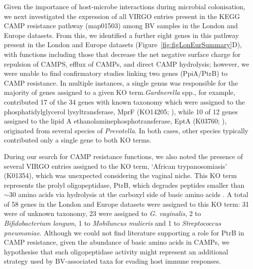 \documentclass[sn-mathphys,Numbered]{sn-jnl}%
\begin{document}
Given the importance of host-microbe interactions during microbial colonisation, we next investigated the expression of all VIRGO entries present in the KEGG CAMP resistance pathway (map01503) among BV samples in the London and Europe datasets. From this, we identified a further eight genes in this pathway present in the London and Europe datasets (Figure~\ref{fig:figLonEurSummary}D), with functions including those that decrease the net negative surface charge for repulsion of CAMPS, efflux of CAMPs, and direct CAMP hydrolysis; however, we were unable to find confirmatory studies linking two genes (PpiA/PtrB) to CAMP resistance. In multiple instances, a single genus was responsible for the majority of genes assigned to a given KO term.\textit{Gardnerella} spp., for example, contributed 17 of the 34 genes with known taxonomy which were assigned to the phosphatidylglycerol lysyltransferase, MprF (KO14205; \citep{ernst_bacterial_2009}), while 10 of 12 genes assigned to the lipid A ethanolaminephosphotransferase, EptA (K03760; \citep{raetz_lipid_2007}), originated from several species of \textit{Prevotella}. In both cases, other species typically contributed only a single gene to both KO terms.

During our search for CAMP resistance functions, we also noted the presence of several VIRGO entries assigned to the KO term, `African trypanosomiasis' (K01354), which was unexpected considering the vaginal niche. This KO term represents the prolyl oligopeptidase, PtrB, which degrades peptides smaller than $\sim$30 amino acids via hydrolysis at the carboxyl side of basic amino acids \citep{coetzer_oligopeptidase_2008}. A total of 58 genes in the London and Europe datasets were assigned to this KO term: 31 were of unknown taxonomy, 23 were assigned to \textit{G. vaginalis}, 2 to \textit{Bifidobacterium longum}, 1 to \textit{Mobiluncus mulieris} and 1 to \textit{Streptococcus pneumoniae}. Although we could not find literature supporting a role for PtrB in CAMP resistance, given the abundance of basic amino acids in CAMPs, we hypothesise that such oligopeptidase activity might represent an additional strategy used by BV-associated taxa for evading host immune responses.
\end{document}
